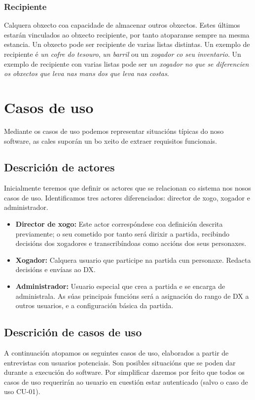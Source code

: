 \subsubsection{Recipiente}
Calquera obxecto coa capacidade de almacenar outros obxectos. Estes últimos
estarán vinculados ao obxecto recipiente, por tanto atoparanse sempre na mesma
estancia. Un obxecto pode ser recipiente de varias listas distintas.
Un exemplo de recipiente é {\it un cofre do tesouro}, {\it un barril} ou un {\it
xogador co seu inventario}. Un exemplo de recipiente con varias listas pode ser
{\it un xogador no que se diferencien os obxectos que leva nas mans dos que leva
nas costas}.


\section{Casos de uso}
Mediante os casos de uso podemos representar situacións típicas do noso
software, as cales suporán un bo xeito de extraer requisitos funcionais.

\subsection{Descrición de actores}
Inicialmente teremos que definir os actores que se relacionan co sistema nos
nosos casos de uso. Identificamos tres actores diferenciados: director de xogo,
xogador e administrador.
\begin{itemize}
\item {\bf Director de xogo:} Este actor correspóndese coa definición descrita previamente; o seu cometido por tanto será dirixir a partida, recibindo decisións dos xogadores e transcribíndoas como accións dos seus personaxes.
\item {\bf Xogador:} Calquera usuario que participe na partida cun personaxe. Redacta decisións e envíaas ao DX.
\item {\bf Administrador:} Usuario especial que crea a partida e se encarga de administrala. As súas principais funcións será a asignación do rango de DX a outros usuarios, e a configuración básica da partida.
\end{itemize}

\subsection{Descrición de casos de uso}
A continuación atopamos os seguintes casos de uso, elaborados a partir de
entrevistas con usuarios potenciais. Son posibles situacións que se poden dar
durante a execución do software.
Por simplificar daremos por feito que todos os casos de uso requerirán ao
usuario en cuestión estar autenticado (salvo o caso de uso CU-01).

